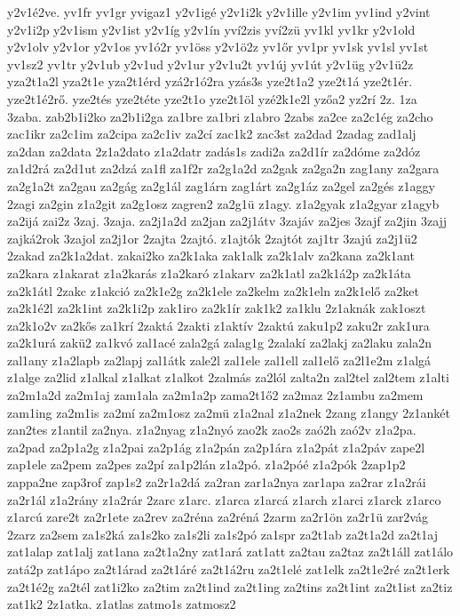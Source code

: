 {y2v1é2ve.
yv1fr
yv1gr
yvigaz1
y2v1igé
y2v1i2k
y2v1ille
y2v1im
yv1ind
y2vint
y2v1i2p
y2v1ism
y2v1ist
y2v1íg
y2v1ín
yví2zis
yví2zü
yv1kl
yv1kr
y2v1old
y2v1olv
y2v1or
y2v1os
yv1ó2r
yv1öss
y2v1ö2z
yv1őr
yv1pr
yv1sk
yv1sl
yv1st
yv1sz2
yv1tr
y2v1ub
y2v1ud
y2v1ur
y2v1u2t
yv1új
yv1út
y2v1üg
y2v1ü2z
yza2t1a2l
yza2t1e
yza2t1érd
yzá2r1ó2ra
yzás3s
yze2t1a2
yze2t1á
yze2t1ér.
yze2t1é2rő.
yze2tés
yze2téte
yze2t1o
yze2t1öl
yzé2k1e2l
yzőa2
yz2rí
2z.
1za
3zaba.
zab2b1i2ko
za2b1i2ga
za1bre
za1bri
z1abro
2zabs
za2ce
za2c1ég
za2cho
zac1ikr
za2c1im
za2cipa
za2c1iv
za2cí
zac1k2
zac3st
za2dad
2zadag
zad1alj
za2dan
za2data
2z1a2dato
z1a2datr
zadás1s
zadi2a
za2d1ír
za2dóme
za2dóz
za1d2rá
za2d1ut
za2dzá
za1fl
za1f2r
za2g1a2d
za2gak
za2ga2n
zag1any
za2gara
za2g1a2t
za2gau
za2gág
za2g1ál
zag1árn
zag1árt
za2g1áz
za2gel
za2gés
z1aggy
2zagi
za2gin
z1a2git
za2g1osz
zagren2
za2g1ü
z1agy.
z1a2gyak
z1a2gyar
z1agyb
za2ijá
zai2z
3zaj.
3zaja.
za2j1a2d
za2jan
za2j1átv
3zajáv
za2jes
3zajf
za2jin
3zajj
zajká2rok
3zajol
za2j1or
2zajta
2zajtó.
z1ajtók
2zajtót
zaj1tr
3zajú
za2j1ü2
2zakad
za2k1a2dat.
zakai2ko
za2k1aka
zak1alk
za2k1alv
za2kana
za2k1ant
za2kara
z1akarat
z1a2karás
z1a2karó
z1akarv
za2k1atl
za2k1á2p
za2k1áta
za2k1átl
2zakc
z1akció
za2k1e2g
za2k1ele
za2kelm
za2k1eln
za2k1elő
za2ket
za2k1é2l
za2k1int
za2k1i2p
zak1iro
za2k1ír
zak1k2
za1klu
2z1aknák
zak1oszt
za2k1o2v
za2kős
za1krí
2zaktá
2zakti
z1aktív
2zaktú
zaku1p2
zaku2r
zak1ura
za2k1urá
zakü2
za1kvó
zal1acé
zala2gá
zalag1g
2zalakí
za2lakj
za2laku
zala2n
zal1any
z1a2lapb
za2lapj
zal1átk
zale2l
zal1ele
zal1ell
zal1elő
za2l1e2m
z1algá
z1alge
za2lid
z1alkal
z1alkat
z1alkot
2zalmás
za2lól
zalta2n
zal2tel
zal2tem
z1alti
za2m1a2d
za2m1aj
zam1ala
za2m1a2p
zama2t1ő2
za2maz
2z1ambu
za2mem
zam1ing
za2m1is
za2mí
za2m1osz
za2mü
z1a2nal
z1a2nek
2zang
z1angy
2z1ankét
zan2tes
z1antil
za2nya.
z1a2nyag
z1a2nyó
zao2k
zao2s
zaó2h
zaó2v
z1a2pa.
za2pad
za2p1a2g
z1a2pai
za2p1ág
z1a2pán
za2p1ára
z1a2pát
z1a2páv
zape2l
zap1ele
za2pem
za2pes
za2pí
za1p2lán
z1a2pó.
z1a2póé
z1a2pók
2zap1p2
zappa2ne
zap3rof
zap1s2
za2r1a2dá
za2ran
zar1a2nya
zar1apa
za2rar
z1a2rái
za2r1ál
z1a2rány
z1a2rár
2zarc
z1arc.
z1arca
z1arcá
z1arch
z1arci
z1arck
z1arco
z1arcú
zare2t
za2r1ete
za2rev
za2réna
za2réná
2zarm
za2r1ön
za2r1ü
zar2vág
2zarz
za2sem
za1s2ká
za1s2ko
za1s2li
za1s2pó
za1spr
za2t1ab
za2t1a2d
za2t1aj
zat1alap
zat1alj
zat1ana
za2t1a2ny
zat1ará
zat1att
za2tau
za2taz
za2t1áll
zat1álo
zatá2p
zat1ápo
za2t1árad
za2t1áré
za2t1á2ru
za2t1elé
zat1elk
za2t1e2ré
za2t1erk
za2t1é2g
za2tél
zat1i2ko
za2tim
za2t1ind
za2t1ing
za2tins
za2t1int
za2t1ist
za2tiz
zat1k2
2z1atka.
z1atlas
zatmo1s
zatmosz2
}
